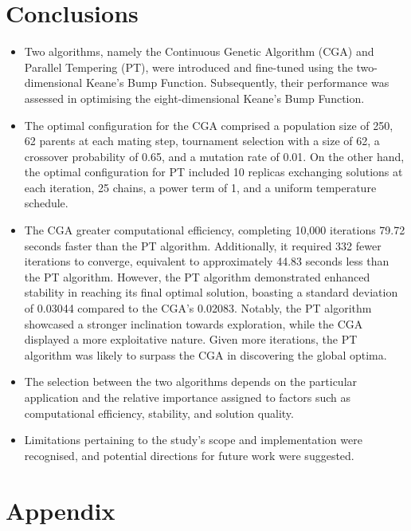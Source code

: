 \documentclass[10pt]{article}
\begin{document}
\section{Conclusions}
\begin{itemize}
    \item Two algorithms, namely the Continuous Genetic Algorithm (CGA) and Parallel Tempering (PT), were introduced and fine-tuned using the two-dimensional Keane's Bump Function. Subsequently, their performance was assessed in optimising the eight-dimensional Keane's Bump Function.
    \item The optimal configuration for the CGA comprised a population size of 250, 62 parents at each mating step, tournament selection with a size of 62, a crossover probability of 0.65, and a mutation rate of 0.01. On the other hand, the optimal configuration for PT included 10 replicas exchanging solutions at each iteration, 25 chains, a power term of 1, and a uniform temperature schedule.
    \item The CGA greater computational efficiency, completing 10,000 iterations 79.72 seconds faster than the PT algorithm. Additionally, it required 332 fewer iterations to converge, equivalent to approximately 44.83 seconds less than the PT algorithm. However, the PT algorithm demonstrated enhanced stability in reaching its final optimal solution, boasting a standard deviation of 0.03044 compared to the CGA's 0.02083. Notably, the PT algorithm showcased a stronger inclination towards exploration, while the CGA displayed a more exploitative nature. Given more iterations, the PT algorithm was likely to surpass the CGA in discovering the global optima.
    \item The selection between the two algorithms depends on the particular application and the relative importance assigned to factors such as computational efficiency, stability, and solution quality.
    \item Limitations pertaining to the study's scope and implementation were recognised, and potential directions for future work were suggested.
\end{itemize}

\newpage
\section{Appendix}
\end{document}
